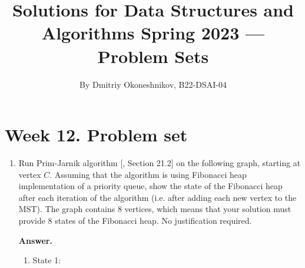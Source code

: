\documentclass{article}
\title{Solutions for Data Structures and Algorithms Spring 2023 — Problem Sets}
\author{By Dmitriy Okoneshnikov, B22-DSAI-04}
\begin{document}
\maketitle

\section*{Week 12. Problem set}

\begin{enumerate}
    \item Run Prim-Jarnik algorithm [, Section 21.2] on the following graph, starting at vertex $C$. Assuming that the algorithm is using Fibonacci heap implementation of a priority queue, show the state of the Fibonacci heap after each iteration of the algorithm (i.e. after adding each new vertex to the MST). The graph contains 8 vertices, which means that your solution must provide 8 states of the Fibonacci heap. No justification required.

    \begin{center}
    \end{center}

    \textbf{Answer.}
    

    \begin{enumerate}
        \item State 1:

        \begin{center}
\end{center}
\end{enumerate}
\end{enumerate}
\end{document}
